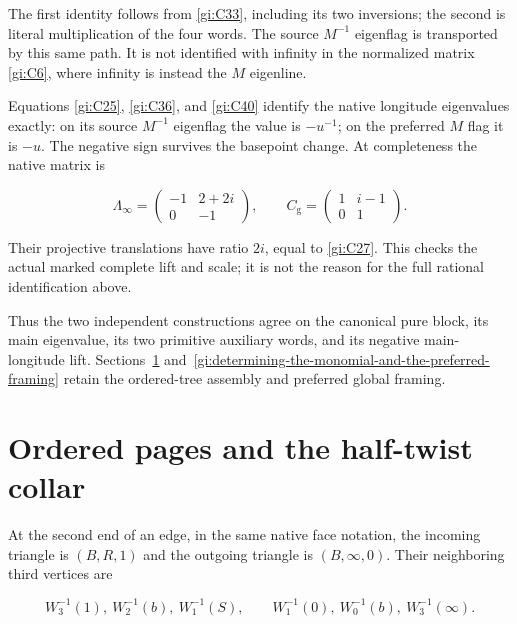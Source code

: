 The first identity follows from \eqref{gi:C33}, including its two inversions; the second is literal multiplication of the four words. The source \(M^{-1}\) eigenflag is transported by this same path. It is not identified with infinity in the normalized matrix \eqref{gi:C6}, where infinity is instead the \(M\) eigenline.

Equations \eqref{gi:C25}, \eqref{gi:C36}, and \eqref{gi:C40} identify the native longitude eigenvalues exactly: on its source \(M^{-1}\) eigenflag the value is \(-u^{-1}\); on the preferred \(M\) flag it is \(-u\). The negative sign survives the basepoint change. At completeness the native matrix is

\begin{equation}\label{gi:C41}
\Lambda_\infty=
 \begin{pmatrix}-1&2+2i\\0&-1\end{pmatrix},\qquad
 C_{\mathrm g}=
 \begin{pmatrix}1&i-1\\0&1\end{pmatrix}.
\end{equation}

Their projective translations have ratio \(2i\), equal to \eqref{gi:C27}. This checks the actual marked complete lift and scale; it is not the reason for the full rational identification above.

Thus the two independent constructions agree on the canonical pure block, its main eigenvalue, its two primitive auxiliary words, and its negative main-longitude lift. Sections~\ref{gi:ordered-pages-and-the-half-twist-collar} and~\ref{gi:determining-the-monomial-and-the-preferred-framing} retain the ordered-tree assembly and preferred global framing.

\section{Ordered pages and the half-twist collar}\label{gi:ordered-pages-and-the-half-twist-collar}

At the second end of an edge, in the same native face notation,
the incoming triangle is \((B,R,1)\) and the outgoing triangle
is \((B,\infty,0)\). Their neighboring third vertices are

\begin{equation}\label{gi:S0}
W_3^{-1}(1),\ W_2^{-1}(b),\ W_1^{-1}(S),\qquad
 W_1^{-1}(0),\ W_0^{-1}(b),\ W_3^{-1}(\infty).
\end{equation}


